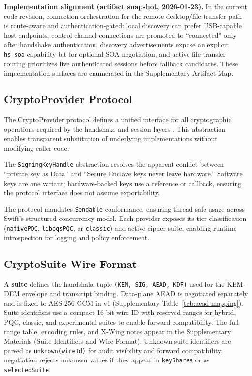 \documentclass[10pt,journal,compsoc]{IEEEtran}
\begin{document}
\textbf{Implementation alignment (artifact snapshot, 2026-01-23).} In the
current code revision, connection orchestration for the remote
desktop/file-transfer path is route-aware and authentication-gated:
local discovery can prefer USB-capable host endpoints, control-channel
connections are promoted to ``connected'' only after handshake
authentication, discovery advertisements expose an explicit
\texttt{hs\_soa} capability bit for optional SOA negotiation, and active
file-transfer routing prioritizes live
authenticated sessions before fallback candidates. These implementation
surfaces are enumerated in the Supplementary Artifact Map.

\subsection{CryptoProvider
Protocol}\label{b.-cryptoprovider-protocol}

The CryptoProvider protocol defines a unified interface for all
cryptographic operations required by the handshake and session layers \cite{ref37}.
This abstraction enables transparent substitution of underlying
implementations without modifying caller code.


The \texttt{SigningKeyHandle} abstraction resolves the apparent conflict
between ``private key as Data'' and ``Secure Enclave keys never leave
hardware.'' Software keys are one variant; hardware-backed keys use a
reference or callback, ensuring the protocol interface does not assume
exportability.

The protocol mandates \texttt{Sendable} conformance, ensuring
thread-safe usage across Swift's structured concurrency model. Each
provider exposes its tier classification (\texttt{nativePQC},
\texttt{liboqsPQC}, or \texttt{classic}) and active cipher suite,
enabling runtime introspection for logging and policy enforcement.

\subsection{CryptoSuite Wire
Format}\label{c.-cryptosuite-wire-format}

A \textbf{suite} defines the handshake tuple
\texttt{(KEM,\ SIG,\ AEAD,\ KDF)} used for the KEM-DEM envelope and
transcript binding. Data-plane AEAD is negotiated separately and is
fixed to AES-256-GCM in v1 (Supplementary Table~\ref{tab:aead-mapping}). Suite identifiers use a compact
16-bit wire ID with reserved ranges for hybrid, PQC, classic, and
experimental suites to enable forward compatibility. The full range
table, encoding rules, and X-Wing notes appear in the Supplementary
Materials (Suite Identifiers and Wire Format). Unknown suite identifiers
are parsed as \texttt{unknown(wireId)} for audit visibility and forward
compatibility; negotiation rejects unknown values if they appear in
\texttt{keyShares} or as \texttt{selectedSuite}.
\end{document}
